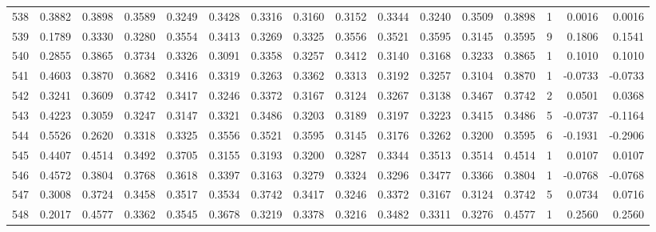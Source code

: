 \begin{tabular}{lrrrrrrrrrrrrrrr}
538 &      0.3882 &  0.3898 &  0.3589 &  0.3249 &  0.3428 &  0.3316 &  0.3160 &  0.3152 &  0.3344 &  0.3240 &   0.3509 &     0.3898 &      1 &                    0.0016 &                     0.0016 \\
539 &      0.1789 &  0.3330 &  0.3280 &  0.3554 &  0.3413 &  0.3269 &  0.3325 &  0.3556 &  0.3521 &  0.3595 &   0.3145 &     0.3595 &      9 &                    0.1806 &                     0.1541 \\
540 &      0.2855 &  0.3865 &  0.3734 &  0.3326 &  0.3091 &  0.3358 &  0.3257 &  0.3412 &  0.3140 &  0.3168 &   0.3233 &     0.3865 &      1 &                    0.1010 &                     0.1010 \\
541 &      0.4603 &  0.3870 &  0.3682 &  0.3416 &  0.3319 &  0.3263 &  0.3362 &  0.3313 &  0.3192 &  0.3257 &   0.3104 &     0.3870 &      1 &                   -0.0733 &                    -0.0733 \\
542 &      0.3241 &  0.3609 &  0.3742 &  0.3417 &  0.3246 &  0.3372 &  0.3167 &  0.3124 &  0.3267 &  0.3138 &   0.3467 &     0.3742 &      2 &                    0.0501 &                     0.0368 \\
543 &      0.4223 &  0.3059 &  0.3247 &  0.3147 &  0.3321 &  0.3486 &  0.3203 &  0.3189 &  0.3197 &  0.3223 &   0.3415 &     0.3486 &      5 &                   -0.0737 &                    -0.1164 \\
544 &      0.5526 &  0.2620 &  0.3318 &  0.3325 &  0.3556 &  0.3521 &  0.3595 &  0.3145 &  0.3176 &  0.3262 &   0.3200 &     0.3595 &      6 &                   -0.1931 &                    -0.2906 \\
545 &      0.4407 &  0.4514 &  0.3492 &  0.3705 &  0.3155 &  0.3193 &  0.3200 &  0.3287 &  0.3344 &  0.3513 &   0.3514 &     0.4514 &      1 &                    0.0107 &                     0.0107 \\
546 &      0.4572 &  0.3804 &  0.3768 &  0.3618 &  0.3397 &  0.3163 &  0.3279 &  0.3324 &  0.3296 &  0.3477 &   0.3366 &     0.3804 &      1 &                   -0.0768 &                    -0.0768 \\
547 &      0.3008 &  0.3724 &  0.3458 &  0.3517 &  0.3534 &  0.3742 &  0.3417 &  0.3246 &  0.3372 &  0.3167 &   0.3124 &     0.3742 &      5 &                    0.0734 &                     0.0716 \\
548 &      0.2017 &  0.4577 &  0.3362 &  0.3545 &  0.3678 &  0.3219 &  0.3378 &  0.3216 &  0.3482 &  0.3311 &   0.3276 &     0.4577 &      1 &                    0.2560 &                     0.2560 \\

\end{tabular}
